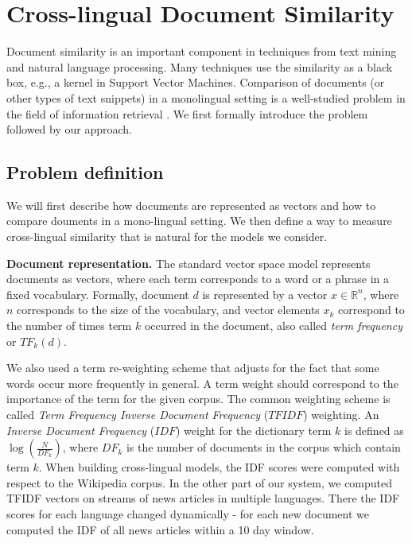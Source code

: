 \documentclass[twoside,11pt]{article}
\newcommand{\RR}{\mathbb{R}}
\begin{document}
\section{Cross-lingual Document Similarity}
\label{sec:crosslingual}
Document similarity is an important component in techniques from text mining and natural language processing. Many techniques use the similarity as a black box, e.g., a kernel in Support Vector Machines. Comparison of documents (or other types of text snippets) in a monolingual setting is a well-studied problem in the field of information retrieval \cite{Salton88term-weightingapproaches}. We first formally introduce the problem followed by our approach.

\subsection{Problem definition}\label{sec:tfidf}
We will first describe how documents are represented as vectors and how to compare douments in a mono-lingual setting. We then define a way to measure cross-lingual similarity that is natural for the models we consider.

\noindent\textbf{Document representation.}
The standard vector space model \cite{Salton88term-weightingapproaches} represents documents as vectors, where each term corresponds to a word or a phrase in a fixed vocabulary. Formally, document $d$ is represented by a vector $x \in \RR^n$, where $n$ corresponds to the size of the vocabulary, and vector elements $x_k$ correspond to the number of times term $k$ occurred in the document, also called \emph{term frequency} or $TF_k(d)$.

We also used a term re-weighting scheme that adjusts for the fact that some words occur more frequently in general. A term weight should correspond to the importance of the term for the given corpus. The common weighting scheme is called \emph{Term Frequency Inverse Document Frequency} ($TFIDF$) weighting. An \emph{Inverse Document Frequency} ($IDF$) weight for the dictionary term $k$ is defined as $\log\left( \frac{N}{DF_k} \right)$, where $DF_k$ is the number of documents in the corpus which contain term $k$.
When building cross-lingual models, the IDF scores were computed with respect to the Wikipedia corpus. In the other part of our system, we computed TFIDF vectors on streams of news articles in multiple languages. There the IDF scores for each language changed dynamically - for each new document we computed the IDF of all news articles within a 10 day window.
\end{document}
